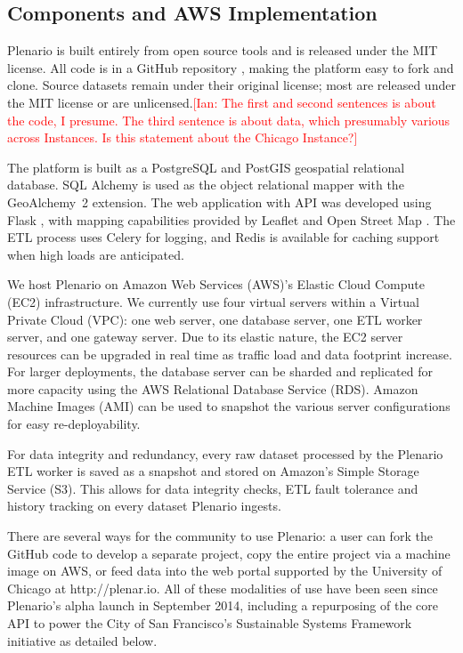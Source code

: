 \documentclass[11pt]{article}
\newcommand{\ian}[1]{\textcolor{Red}{[Ian: #1]}}
\newcommand{\ian}[1]{}
\begin{document}
\subsection{Components and AWS Implementation}
Plenario is built entirely from open source tools and is released under the MIT license. All code is in a GitHub repository \cite{plenario-github}, making the platform easy to fork and clone. Source datasets remain under their original license; most are released under the MIT license or are unlicensed.\ian{The first and second sentences is about the code, I presume. The third sentence is about data, which presumably various across Instances. Is this statement about the Chicago Instance?}

The platform is built as a PostgreSQL and PostGIS geospatial relational database. SQL Alchemy \cite{sqlalchemy} is used as the object relational mapper with the GeoAlchemy~2 extension. The web application with API was developed using Flask \cite{flask}, with mapping capabilities provided by Leaflet \cite{leaflet} and Open Street Map \cite{openstreetmap}. The ETL process uses Celery \cite{celery} for logging, and Redis \cite{redis} is available for caching support when high loads are anticipated. 

We host Plenario on Amazon Web Services (AWS)'s Elastic Cloud Compute (EC2) infrastructure. We currently use four virtual servers within a Virtual Private Cloud (VPC): one web server, one database server, one ETL worker server, and one gateway server. Due to its elastic nature, the EC2 server resources can be upgraded in real time as traffic load and data footprint increase. For larger deployments, the database server can be sharded and replicated for more capacity using the AWS Relational Database Service (RDS). Amazon Machine Images (AMI) can be used to snapshot the various server configurations for easy re-deployability.

For data integrity and redundancy, every raw dataset processed by the Plenario ETL worker is saved as a snapshot and stored on Amazon's Simple Storage Service (S3). This allows for data integrity checks, ETL fault tolerance and history tracking on every dataset Plenario ingests.

There are several ways for the community to use Plenario: a user can fork the GitHub code to develop a separate project, copy the entire project via a machine image on AWS, or feed data into the web portal supported by the University of Chicago at http://plenar.io. All of these modalities of use have been seen since Plenario's alpha launch in September 2014, including a repurposing of the core API to power the City of San Francisco's Sustainable Systems Framework initiative as detailed below. 
\end{document}
